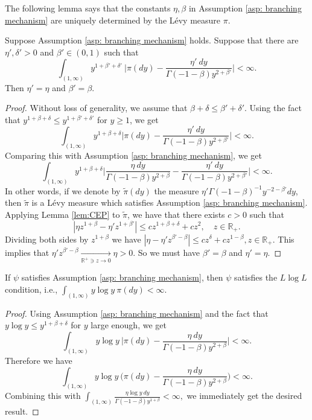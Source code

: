 \documentclass[EJP]{ejpecp} %
\begin{document}
The following lemma says that the constants $\eta, \beta$ in Assumption \ref{asp: branching mechanism} are uniquely determined by the L\'evy measure $\pi$.
\begin{lemma}
  \label{lem: unique of beta and eta}
  Suppose Assumption  \ref{asp: branching mechanism} holds. Suppose that there are $\eta', \delta'>0$ and $\beta'\in (0,1)$ such that
  \[
    \int_{(1,\infty)} y^{ 1 + \beta'  + \delta' }~ \Big| \pi(dy) - \frac {\eta' ~dy} {\Gamma (- 1 - \beta ) y^{2 + \beta'}} \Big|
    < \infty.
  \]
	Then $\eta'= \eta$ and $\beta ' = \beta$.
\end{lemma}
\begin{proof}
	Without loss of generality, we assume that $\beta+\delta \leq \beta'+ \delta'$.
	Using  the fact that $y^{1+\beta+ \delta} \leq y^{1+\beta'+\delta'}$ for $y \geq 1$, we get
  \[
    \int_{(1, \infty)} y^{1 + \beta + \delta}   \Big| \pi(dy) - \frac {\eta' ~dy} {\Gamma( - 1 - \beta)y^{2 + \beta'}} \Big|
    < \infty .
  \]
	Comparing this with Assumption \ref{asp: branching mechanism}, we get
  \[
    \int_{(1,\infty)} y^{ 1 + \beta + \delta} \Big| \frac { \eta ~dy} {\Gamma (- 1 - \beta) y^{2 + \beta}} - \frac {\eta' ~dy} {\Gamma (- 1 - \beta) y^{2 + \beta'}} \Big| < \infty.
  \]
	In other words, if we denote by $\widetilde \pi(dy)$ the measure $\eta' \Gamma(-1-\beta)^{-1} y^{-2-\beta'} dy$, then $\widetilde \pi$ is a L\'evy measure which satisfies Assumption \ref{asp: branching mechanism}.
	Applying Lemma \ref{lem:CEP} to $\widetilde \pi$, we have that there exists $c>0$ such that
  \[
    | \eta z^{ 1 + \beta } - \eta' z^{ 1 + \beta' } |
    \leq c z^{ 1 + \beta + \delta } + c z^2
    , \quad z \in \mathbb R_+.
  \]
  Dividing both sides by $z^{1+\beta}$ we have
   $
   | \eta - \eta' z^{ \beta' - \beta } |
    \leq cz^{\delta}+cz^{1-\beta}
    ,	z \in \mathbb R_+.
 $
	This implies that $ \eta' z^{\beta' - \beta} \xrightarrow[\mathbb R^+\ni z\to 0]{} \eta >0. $
	So we must have $\beta'= \beta$ and $\eta'= \eta$.
\end{proof}
\begin{lemma}
  \label{lem: LlogL criterion}
  If $\psi$ satisfies Assumption  \ref{asp: branching mechanism}, then $\psi$ satisfies the $L \log L$ condition, i.e.,
   $
    \int_{(1,\infty)} y \log y~\pi(dy)
    < \infty.
 $
\end{lemma}
\begin{proof}
	Using  Assumption \ref{asp: branching mechanism} and the fact that $y\log y \leq y^{1+\beta+\delta}$ for $y$ large enough, we get
  \[
    \int_{(1,\infty)} y \log y ~\Big| \pi(dy) - \frac { \eta ~dy } { \Gamma ( - 1 - \beta ) y^{ 2 + \beta } } \Big|
    < \infty.
  \]
	Therefore we have
  \[
    \int_{ ( 1, \infty ) } y \log y ~\Big( \pi(dy) - \frac { \eta ~dy } { \Gamma ( - 1 - \beta ) y^{ 2 + \beta } } \Big)
    < \infty.
  \]
  Combining this with
  $
  \int_{ ( 1, \infty ) } \frac { \eta \log y ~dy } { \Gamma ( - 1 - \beta ) y^{ 1 + \beta } }
    < \infty,
 $
  we immediately get the desired result.
\end{proof}
\end{document}

